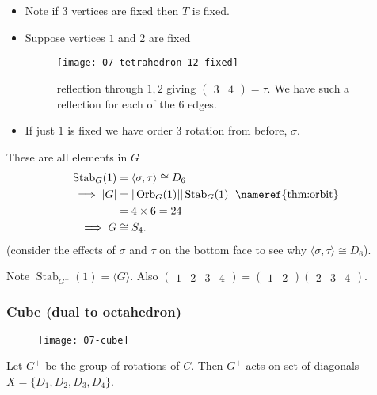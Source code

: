 \begin{itemize}
    \item Note if $3$ vertices are fixed then $T$ is fixed.

    \item Suppose vertices $1$ and $2$ are fixed
    \begin{figure} 
        \centering 
        \texttt{[image: 07-tetrahedron-12-fixed]} 
        \caption{reflection through $1, 2$ giving $\begin{pmatrix}3 & 4\end{pmatrix} = \tau$. We have such a reflection for each of the $6$ edges.}
    \end{figure}

    \item If just $1$ is fixed we have order $3$ rotation from before, $\sigma$.
\end{itemize} 
These are all elements in $G$
\begin{align*}
    \operatorname{Stab}_G(1) &= \langle \sigma, \tau \rangle \cong D_6 \\
    \implies |G| &= |\operatorname{Orb}_G(1)| |\operatorname{Stab}_G(1)| \text{ \nameref{thm:orbit}}\\
    &= 4 \times 6 = 24 \\
    \implies G &\cong S_4.
\end{align*} (consider the effects of $\sigma$ and $\tau$ on the bottom face to see why $\langle \sigma, \tau \rangle \cong D_6$).

Note $\operatorname{Stab}_{G^+}(1) = \langle G \rangle$.
Also $\begin{pmatrix}1 & 2 & 3 & 4\end{pmatrix} = \begin{pmatrix}1 & 2\end{pmatrix} \begin{pmatrix}2 & 3 & 4\end{pmatrix}$.

\subsubsection{Cube (dual to octahedron)}

\begin{figure}
    \centering 
    \texttt{[image: 07-cube]} 
\end{figure}

Let $G^+$ be the group of rotations of $C$.
Then $G^+$ acts on set of diagonals $X = \{D_1, D_2, D_3, D_4\}$.


